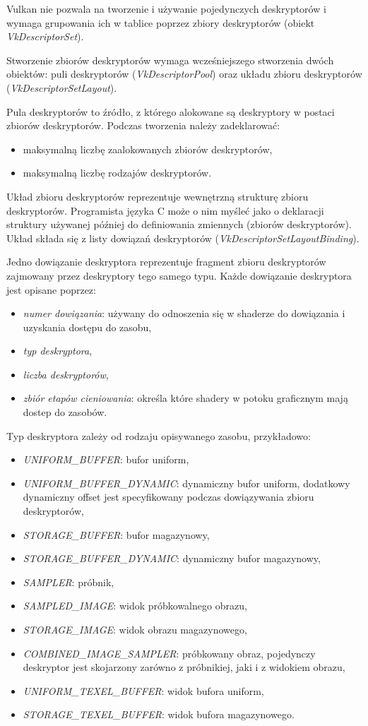 Vulkan nie pozwala na tworzenie i używanie pojedynczych deskryptorów i wymaga grupowania ich w tablice poprzez zbiory deskryptorów  (obiekt \textit{VkDescriptorSet}).

Stworzenie zbiorów deskryptorów wymaga wcześniejszego stworzenia dwóch obiektów: puli deskryptorów (\textit{VkDescriptorPool})
oraz układu zbioru deskryptorów (\textit{VkDescriptorSetLayout}).

Pula deskryptorów to źródło, z którego alokowane są deskryptory w postaci zbiorów deskryptorów. Podczas tworzenia należy zadeklarować:
\begin{itemize}
	\item maksymalną liczbę zaalokowanych zbiorów deskryptorów,
	\item maksymalną liczbę rodzajów deskryptorów.
\end{itemize}

Układ zbioru deskryptorów reprezentuje wewnętrzną strukturę zbioru deskryptorów. Programista języka C może o nim myśleć jako o deklaracji struktury używanej później do definiowania zmiennych (zbiorów deskryptorów).
Układ składa się z listy dowiązań deskryptorów (\textit{VkDescriptorSetLayoutBinding}).

Jedno dowiązanie deskryptora reprezentuje fragment zbioru deskryptorów zajmowany przez deskryptory tego samego typu.
Każde dowiązanie deskryptora jest opisane poprzez:
\begin{itemize}
	\item {\textit{numer dowiązania}}: używany do odnoszenia się w shaderze do dowiązania i uzyskania dostępu do
	zasobu,
	\item \textit{typ deskryptora},
	\item \textit{liczba deskryptorów},
	\item {\textit{zbiór etapów cieniowania}}: określa które shadery w potoku graficznym mają dostep do zasobów.
\end{itemize}
Typ deskryptora zależy od rodzaju opisywanego zasobu, przykładowo:
\begin{itemize}
	\item {\textit{UNIFORM\_BUFFER}}: bufor uniform,
	\item {\textit{UNIFORM\_BUFFER\_DYNAMIC}}: dynamiczny bufor uniform, dodatkowy dynamiczny offset jest specyfikowany podczas dowiązywania zbioru deskryptorów,
	\item {\textit{STORAGE\_BUFFER}}: bufor magazynowy,
	\item {\textit{STORAGE\_BUFFER\_DYNAMIC}}: dynamiczny bufor magazynowy,
	\item {\textit{SAMPLER}}: próbnik,
	\item {\textit{SAMPLED\_IMAGE}}: widok próbkowalnego obrazu,
	\item {\textit{STORAGE\_IMAGE}}: widok obrazu magazynowego,
	\item {\textit{COMBINED\_IMAGE\_SAMPLER}}: próbkowany obraz, pojedynczy deskryptor jest skojarzony zarówno z próbnikiej, jaki i z widokiem obrazu,
	\item {\textit{UNIFORM\_TEXEL\_BUFFER}}: widok bufora uniform,
	\item {\textit{STORAGE\_TEXEL\_BUFFER}}: widok bufora magazynowego.
\end{itemize}


